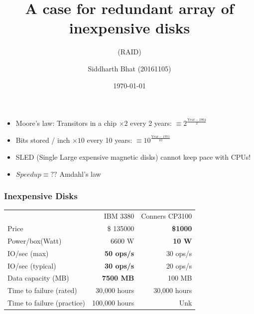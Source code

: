 \documentclass{beamer}
\title{A case for redundant array of inexpensive disks}
\subtitle{(RAID)}
\author{Siddharth Bhat (20161105)}
\date{\today}
\begin{document}
\begin{frame}
\titlepage
\end{frame}

\begin{frame}
    \begin{itemize}
        \item Moore's law: Transitors in a chip $\times 2$ every 2 years: $\equiv 2^{\frac{\text{Year} - 1964}{2}}$
        \item Bits stored / inch  $\times 10$ every 10 years: $\equiv 10^\frac{{\text{Year} - 1971}}{10}$
        \item SLED (Single Large expensive magnetic disks) cannot keep pace with CPUs!
        \item $Speedup \equiv ??$ Amdahl's law
    \end{itemize}
\end{frame}

\begin{frame}
    \frametitle{Inexpensive Disks}
    \begin{tabular}{lrr}
        & IBM 3380 & Conners CP3100  \\
         Price &\$ 135000 & \textbf{\$1000} \\
         Power/box(Watt) & 6600 W & \textbf{10 W} \\
         IO/sec (max)& \textbf{50 ops/s} & 30 ops/s \\
         IO/sec (typical)& \textbf{30 ops/s} & 20 ops/s\\
         Data capacity (MB) & \textbf{7500 MB} & 100 MB \\
         Time to failure (rated) & 30,000 hours & 30,000 hours \\
         Time to failure (practice) & 100,000 hours & Unk \\
    \end{tabular}

\end{frame}
\end{document}
